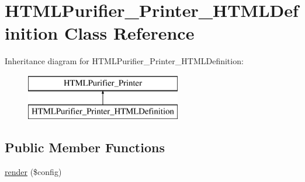 \hypertarget{classHTMLPurifier__Printer__HTMLDefinition}{\section{H\+T\+M\+L\+Purifier\+\_\+\+Printer\+\_\+\+H\+T\+M\+L\+Definition Class Reference}
\label{classHTMLPurifier__Printer__HTMLDefinition}
}
Inheritance diagram for H\+T\+M\+L\+Purifier\+\_\+\+Printer\+\_\+\+H\+T\+M\+L\+Definition\+:\begin{figure}[H]
\begin{center}
\leavevmode
\includegraphics[height=2.000000cm]{classHTMLPurifier__Printer__HTMLDefinition}
\end{center}
\end{figure}
\subsection*{Public Member Functions}
\begin{DoxyCompactItemize}
\item 
\hyperlink{classHTMLPurifier__Printer__HTMLDefinition_a38f1943017263be7263c0155ff609fb1}{render} (\$config)
\end{DoxyCompactItemize}
